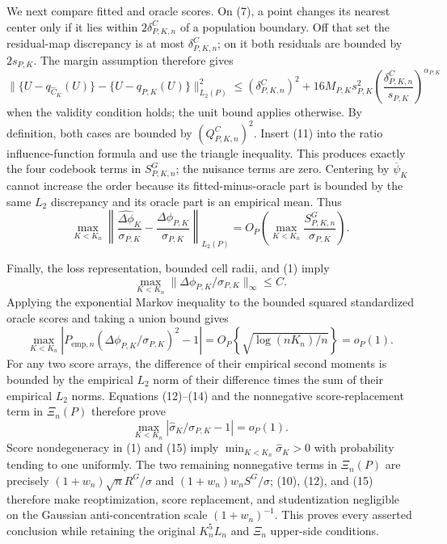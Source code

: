 We next compare fitted and oracle scores.  On (7), a point changes its nearest center only if it lies within \(2\delta^C_{P,K,n}\) of a population boundary.  Off that set the residual-map discrepancy is at most \(\delta^C_{P,K,n}\); on it both residuals are bounded by \(2s_{P,K}\).  The margin assumption therefore gives
\[
 \|\{U-q_{\widehat C_K}(U)\}-\{U-q_{P,K}(U)\}\|_{L_2(P)}^2
 \leq(\delta^C_{P,K,n})^2+16M_{P,K}s_{P,K}^2
 \left(\frac{\delta^C_{P,K,n}}{s_{P,K}}\right)^{\alpha_{P,K}}                         \tag{11}
\]
when the validity condition holds; the unit bound applies otherwise.  By definition, both cases are bounded by \((Q^C_{P,K,n})^2\).  Insert (11) into the ratio influence-function formula and use the triangle inequality.  This produces exactly the four codebook terms in \(S^G_{P,K,n}\); the nuisance terms are zero.  Centering by \(\overline\psi_K\) cannot increase the order because its fitted-minus-oracle part is bounded by the same \(L_2\) discrepancy and its oracle part is an empirical mean.  Thus
\[
 \max_{K<K_n}\left\|
 \frac{\widehat{\Delta\phi}_{K}}{\sigma_{P,K}}
 -\frac{\Delta\phi_{P,K}}{\sigma_{P,K}}\right\|_{L_2(P)}
 =O_P\!\left(\max_{K<K_n}\frac{S^G_{P,K,n}}{\sigma_{P,K}}\right).                     \tag{12}
\]

Finally, the loss representation, bounded cell radii, and (1) imply
\[
 \max_{K<K_n}\|\Delta\phi_{P,K}/\sigma_{P,K}\|_\infty\leq C.                         \tag{13}
\]
Applying the exponential Markov inequality to the bounded squared standardized oracle scores and taking a union bound gives
\[
 \max_{K<K_n}|P_{\mathrm{emp},n}(\Delta\phi_{P,K}/\sigma_{P,K})^2-1|
 =O_P\!\left\{\sqrt{\log(nK_n)/n}\right\}=o_P(1).                                    \tag{14}
\]
For any two score arrays, the difference of their empirical second moments is bounded by the empirical \(L_2\) norm of their difference times the sum of their empirical \(L_2\) norms.  Equations (12)--(14) and the nonnegative score-replacement term in \(\Xi_n(P)\) therefore prove
\[
 \max_{K<K_n}\left|\widehat\sigma_K/\sigma_{P,K}-1\right|=o_P(1).                    \tag{15}
\]
Score nondegeneracy in (1) and (15) imply \(\min_{K<K_n}\widehat\sigma_K>0\) with probability tending to one uniformly.  The two remaining nonnegative terms in \(\Xi_n(P)\) are precisely \((1+w_n)\sqrt nR^G/\sigma\) and \((1+w_n)w_nS^G/\sigma\); (10), (12), and (15) therefore make reoptimization, score replacement, and studentization negligible on the Gaussian anti-concentration scale \((1+w_n)^{-1}\).  This proves every asserted conclusion while retaining the original \(K_n^5L_n\) and \(\Xi_n\) upper-side conditions.